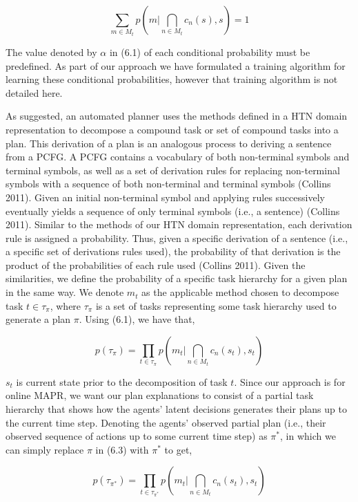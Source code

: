 \begin{equation}
\sum_{m \in M_t} p(m | \bigcap_{n \in M_t} c_n(s), s) = 1
\end{equation}

The value denoted by $\alpha$ in (6.1) of each conditional probability must be predefined. As part of our approach we have formulated a training algorithm for learning these conditional probabilities, however that training algorithm is not detailed here. 

As suggested, an automated planner uses the methods defined in a HTN domain representation to decompose a compound task or set of compound tasks into a plan. This derivation of a plan is an analogous process to deriving a sentence from a PCFG. A PCFG contains a vocabulary of both non-terminal symbols and terminal symbols, as well as a set of derivation rules for replacing non-terminal symbols with a sequence of both non-terminal and terminal symbols (Collins 2011). Given an initial non-terminal symbol and applying rules successively eventually yields a sequence of only terminal symbols (i.e., a sentence) (Collins 2011). Similar to the methods of our HTN domain representation, each derivation rule is assigned a probability. Thus, given a specific derivation of a sentence (i.e., a specific set of derivations rules used), the probability of that derivation is the product of the probabilities of each rule used (Collins 2011). Given the similarities, we define the probability of a specific task hierarchy for a given plan in the same way. We denote $m_t$ as the applicable method chosen to decompose task $t \in \tau_\pi$, where $\tau_\pi$ is a set of tasks representing some task hierarchy used to generate a plan $\pi$. Using (6.1), we have that,

\begin{equation}
p(\tau_\pi) = \prod_{t \in \tau_\pi} p(m_t | \bigcap_{n \in M_t} c_n(s_t), s_t) 
\end{equation}

$s_t$ is current state prior to the decomposition of task $t$. Since our approach is for online MAPR, we want our plan explanations to consist of a partial task hierarchy that shows how the agents' latent decisions generates their plans up to the current time step. Denoting the agents' observed partial plan (i.e., their observed sequence of actions up to some current time step) as $\pi^*$, in which we can simply replace $\pi$ in (6.3) with $\pi^*$ to get,

\begin{equation}
p(\tau_{\pi^*}) = \prod_{t \in \tau_{\pi^*}} p(m_t | \bigcap_{n \in M_t} c_n(s_t), s_t) 
\end{equation}

